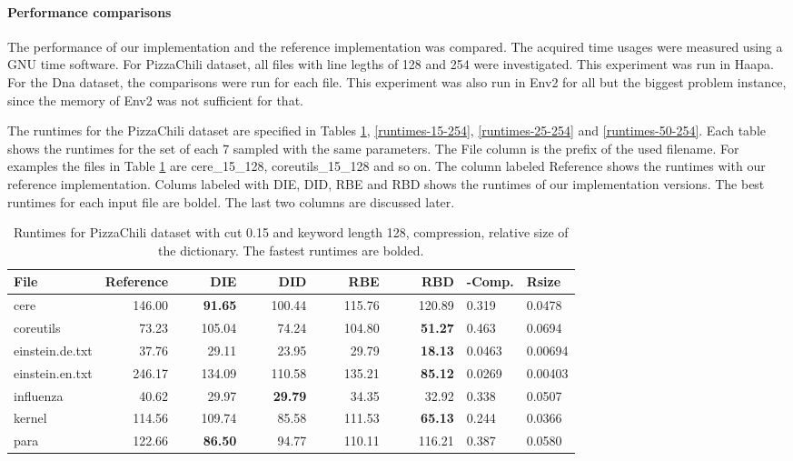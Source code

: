 \documentclass[english,twoside,censored,csm,algorithms-track-2020]{HYthesisML}
\theoremstyle{plain}
\theoremstyle{definition}
\begin{document}
\paragraph{Performance comparisons}
The performance of our implementation and the reference implementation was compared. The acquired
time usages were measured using a GNU time software. For PizzaChili dataset, all files with line
legths of 128 and 254 were investigated. This experiment was run in Haapa. For the Dna dataset,
the comparisons were run for each file. This experiment was also run in Env2 for all but the
biggest problem instance, since the memory of Env2 was not sufficient for that.

The runtimes for the PizzaChili dataset are specified in Tables \ref{runtimes-15-128},
\ref{runtimes-15-254}, \ref{runtimes-25-254} and \ref{runtimes-50-254}. Each table shows the
runtimes for the set of each 7 sampled with the same parameters. The File column is the
prefix of the used filename. For examples the files in Table \ref{runtimes-15-128} are
cere\_15\_128, coreutils\_15\_128 and so on. The column labeled Reference shows the runtimes
with our reference implementation. Colums labeled with DIE, DID, RBE and RBD shows the
runtimes of our implementation versions. The best runtimes for each input file are boldel.
The last two columns are discussed later.

\begin{center}
  \begin{table}
  \begin{tabular} {| l |r r r r r|l l|}
    \hline
    \textbf{File} & \textbf{Reference} & ~~~~\textbf{DIE} & ~~~~\textbf{DID} & ~~~~\textbf{RBE} & ~~~~\textbf{RBD} & \textbf{-Comp.} & \textbf{Rsize} \\
    \hline
    cere & 146.00 & \textbf{91.65} & 100.44 & 115.76 & 120.89            & 0.319  & 0.0478  \\
    coreutils & 73.23 & 105.04 & 74.24 & 104.80 & \textbf{51.27}         & 0.463  & 0.0694  \\
    einstein.de.txt & 37.76 & 29.11 & 23.95 & 29.79 & \textbf{18.13}     & 0.0463 & 0.00694 \\
    einstein.en.txt & 246.17 & 134.09 & 110.58 & 135.21 & \textbf{85.12} & 0.0269 & 0.00403 \\
    influenza & 40.62 & 29.97 & \textbf{29.79} & 34.35 & 32.92           & 0.338  & 0.0507  \\
    kernel & 114.56 & 109.74 & 85.58 & 111.53 & \textbf{65.13}           & 0.244  & 0.0366  \\
    para & 122.66 & \textbf{86.50} & 94.77 & 110.11 & 116.21             & 0.387  & 0.0580  \\
    \hline
  \end{tabular}
  \caption{Runtimes for PizzaChili dataset with cut 0.15 and keyword length 128, compression, relative size of the dictionary. The fastest runtimes are bolded.}
  \label{runtimes-15-128}
  \end{table}
\end{center}
\end{document}
